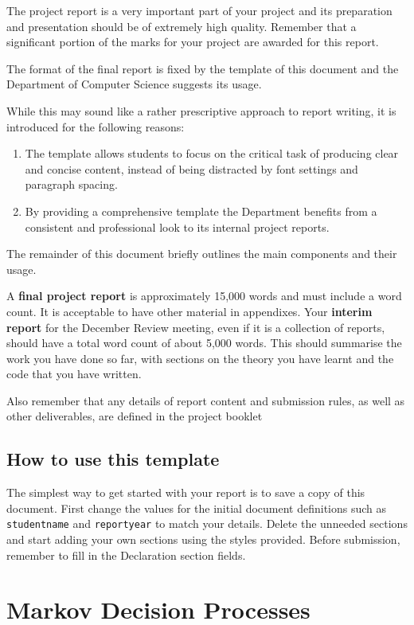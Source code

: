 \documentclass[]{final_report}
\begin{document}
The project report is a very important part of your project and its preparation and presentation should be of extremely high quality. Remember that a significant portion of the marks for your project are awarded for this report. 

The format of the final report is fixed by the template of this document and the Department of Computer Science suggests its usage. 

While this may sound like a rather prescriptive approach to report writing, it is introduced for the following reasons:
\begin{enumerate}
 \item The template allows students to focus on the critical task of producing clear and concise content, instead of being distracted by font settings and paragraph spacing. 
 \item By providing a comprehensive template the Department benefits from a consistent and professional look to its internal project reports.
\end{enumerate}

The remainder of this document briefly outlines the main components and their usage.

A \textbf{final project report} is approximately 15,000 words and must include a word count. It is acceptable to have other material in appendixes.  
Your \textbf{interim report} for the December Review meeting, even if it is a collection of reports, should have a total word count of about 5,000 words. 
This should summarise the work you have done so far, with sections on the theory you have learnt and the code that you have written.

Also remember that any details of report content and submission rules, as well as other deliverables, are defined in the project booklet

\section{How to use this template}

The simplest way to get started with your report is to save a copy of this document. 
First change the values for the initial document definitions such as \verb|studentname| and \verb|reportyear| to match your details.
Delete the unneeded sections and start adding your own sections using the styles provided.
Before submission, remember to fill in the Declaration section fields.

\chapter{Markov Decision Processes} 
\end{document}
